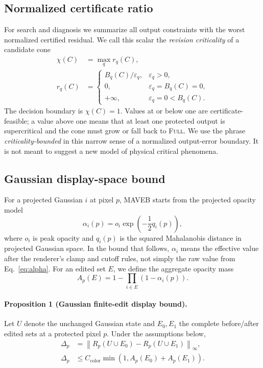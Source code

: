 \documentclass[acmtog,nonacm]{acmart}
\newcommand{\system}{MAVEB}
\newcommand{\FULL}{\textsc{Full}}
\begin{document}
\subsection{Normalized certificate ratio}
For search and diagnosis we summarize all output constraints with the worst normalized certified residual. We call this scalar the \emph{revision criticality} of a candidate cone
\begin{equation}
\begin{aligned}
\chi(C)&=\max_q r_q(C),\\
r_q(C)&=
\begin{cases}
 B_q(C)/\varepsilon_q, & \varepsilon_q>0,\\
 0, & \varepsilon_q=B_q(C)=0,\\
 +\infty, & \varepsilon_q=0<B_q(C).
\end{cases}
\end{aligned}
\label{eq:criticality}
\end{equation}
The decision boundary is $\chi(C)=1$. Values at or below one are certificate-feasible; a value above one means that at least one protected output is supercritical and the cone must grow or fall back to \FULL{}. We use the phrase \emph{criticality-bounded} in this narrow sense of a normalized output-error boundary. It is not meant to suggest a new model of physical critical phenomena.

\subsection{Gaussian display-space bound}
For a projected Gaussian $i$ at pixel $p$, \system{} starts from the projected opacity model
\begin{equation}
\alpha_i(p)=o_i\exp\left(-\frac{1}{2}q_i(p)\right),
\label{eq:alpha}
\end{equation}
where $o_i$ is peak opacity and $q_i(p)$ is the squared Mahalanobis distance in projected Gaussian space. In the bound that follows, $\alpha_i$ means the effective value after the renderer's clamp and cutoff rules, not simply the raw value from Eq.~\ref{eq:alpha}. For an edited set $E$, we define the aggregate opacity mass
\begin{equation}
A_p(E)=1-\prod_{i\in E}\left(1-\alpha_i(p)\right).
\end{equation}

\paragraph{Proposition 1 (Gaussian finite-edit display bound).}
Let $U$ denote the unchanged Gaussian state and $E_0,E_1$ the complete before/after edited sets at a protected pixel $p$. Under the assumptions below,
\begin{equation}
\begin{aligned}
\Delta_p
&=\left\lVert R_p(U\cup E_0)-R_p(U\cup E_1)\right\rVert_\infty,\\
\Delta_p
&\le C_{\mathrm{color}}\min\!\left(1,A_p(E_0)+A_p(E_1)\right).
\end{aligned}
\label{eq:gaussianbound}
\end{equation}
\end{document}

